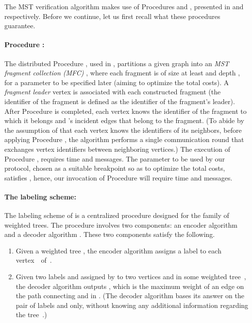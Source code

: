 \documentclass[11pt,letter]{article}
\begin{document}
The MST verification algorithm makes use of Procedures  and , 
presented in \cite{KP_98} and \cite{KKKP_05} respectively. Before we continue, let us first recall what these procedures guarantee. 

\paragraph{Procedure :} 
The distributed Procedure , used in \cite{KP_98}, partitions a given 
graph into an {\em MST fragment collection (MFC)} , where each fragment 
is of size at least  and depth , for a parameter  to be 
specified later (aiming to optimize the total costs). 
A {\em fragment leader} vertex is associated with each constructed fragment 
(the identifier of the fragment is defined as the identifier of the 
fragment's leader). 
After Procedure  is completed, 
each vertex  knows the identifier of the fragment 
to which it belongs  and 's incident edges that belong to the fragment.
(To abide by the assumption of \cite{KP_98} that each vertex 
knows the identifiers of its neighbors, before applying Procedure , 
the algorithm performs a single communication round that exchanges 
vertex identifiers between neighboring vertices.) The execution of 
Procedure , requires  time and 
 messages. 
The parameter  to be used by our protocol, chosen as a suitable breakpoint 
so as to optimize the total costs, satisfies , 
hence, our invocation of Procedure  will require 
 time and  messages.

\paragraph{The   labeling scheme:} 
The labeling scheme  
of \cite{KKKP_05} is a centralized procedure designed for the family of 
weighted trees. The procedure involves two components: 
an encoder algorithm  and 
a decoder algorithm . These two components satisfy the following.
\begin{enumerate}
\item Given a weighted tree , the encoder algorithm  
assigns a label  to each vertex~~of~.
\item Given two labels  and  assigned by  to two vertices  and  in some weighted tree~, the decoder 
algorithm  outputs , which is the maximum weight 
of an edge on the path connecting  and  in . (The decoder 
algorithm  bases its answer on the pair of labels    and  only, without knowing any additional information regarding the tree~.)
\end{enumerate} 
\end{document}

